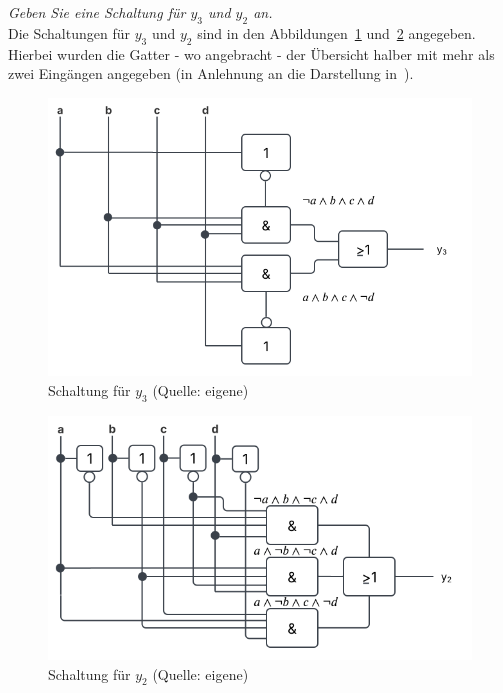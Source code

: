 \textit{Geben Sie eine Schaltung für $y_3$ und $y_2$ an.}\\

\noindent
Die Schaltungen für $y_3$ und $y_2$ sind in den Abbildungen~\ref{fig:schaltplan_y3} und~\ref{fig:schaltplan_y2} angegeben.
Hierbei wurden die Gatter - wo angebracht - der Übersicht halber mit mehr als zwei Eingängen angegeben (in Anlehnung an die Darstellung in~\cite[\textbf{Abbildung 24}, 57]{ES1}).

\begin{figure}
    \centering
    \includegraphics[scale=0.5]{aufgabe 2/img/schaltplan_y3}
    \caption{Schaltung für $y_3$ (Quelle: eigene)}
    \label{fig:schaltplan_y3}
\end{figure}

\begin{figure}
    \centering
    \includegraphics[scale=0.52]{aufgabe 2/img/schaltplan_y2}
    \caption{Schaltung für $y_2$ (Quelle: eigene)}
    \label{fig:schaltplan_y2}
\end{figure}
